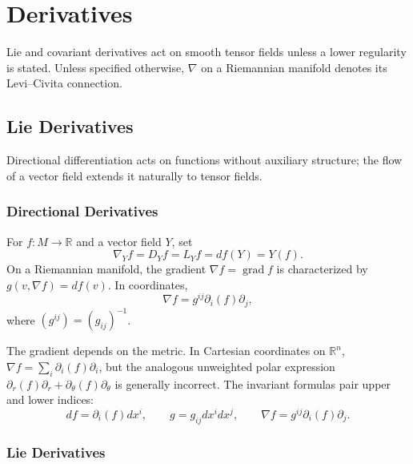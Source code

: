 \chapter{Derivatives}
\label{chap:pet-derivatives}

Lie and covariant derivatives act on smooth tensor fields unless a lower
regularity is stated. Unless specified otherwise, $\nabla$ on a Riemannian
manifold denotes its Levi--Civita connection.

\section{Lie Derivatives}

Directional differentiation acts on functions without auxiliary structure;
the flow of a vector field extends it naturally to tensor fields.

\subsection{Directional Derivatives}

\begin{definition}
  \label{def:pet-ch2-directional-derivative}
  \leanok
  For $f:M\to\mathbb{R}$ and a
  vector field $Y$, set
  \[
    \nabla_Yf=D_Yf=L_Yf=df(Y)=Y(f).
  \]
  On a Riemannian manifold, the gradient
  $\nabla f=\operatorname{grad}f$ is characterized by
  $g(v,\nabla f)=df(v)$. In coordinates,
  \[
    \nabla f=g^{ij}\partial_i(f)\partial_j,
  \]
  where $(g^{ij})=(g_{ij})^{-1}$.
\end{definition}

\begin{remark}
  \label{rem:pet-ch2-gradient-not-invariant}
  \leanok
  The gradient depends on the
  metric. In Cartesian coordinates on $\mathbb{R}^n$,
  $\nabla f=\sum_i\partial_i(f)\partial_i$, but the analogous unweighted
  polar expression
  $\partial_r(f)\partial_r+\partial_\theta(f)\partial_\theta$ is generally
  incorrect. The invariant formulas pair upper and lower indices:
  \[
    df=\partial_i(f)dx^i,\qquad
    g=g_{ij}dx^i dx^j,\qquad
    \nabla f=g^{ij}\partial_i(f)\partial_j.
  \]
\end{remark}

\subsection{Lie Derivatives}

